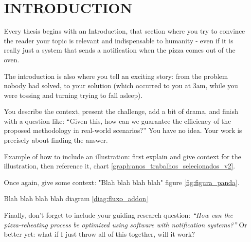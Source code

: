 \chapter{INTRODUCTION}
\label{chap:contextualizacao}

Every thesis begins with an Introduction, that section where you try to convince the reader your topic is relevant and indispensable to humanity - even if it is really just a system that sends a notification when the pizza comes out of the oven.

The introduction is also where you tell an exciting story: from the problem nobody had solved, to your solution (which occurred to you at 3am, while you were tossing and turning trying to fall asleep).

You describe the context, present the challenge, add a bit of drama, and finish with a question like: \enquote{Given this, how can we guarantee the efficiency of the proposed methodology in real-world scenarios?} You have no idea. Your work is precisely about finding the answer.

Example of how to include an illustration: first explain and give context for the illustration, then reference it, chart \ref{graph:anos_trabalhos_selecionados_v2}.



Once again, give some context: "Blah blah blah blah" figure \ref{fig:figura_panda}.




Blah blah blah blah diagram \ref{diag:fluxo_addon}



Finally, don't forget to include your guiding research question: \textit{\enquote{How can the pizza-reheating process be optimized using software with notification systems?}} Or better yet: what if I just throw all of this together, will it work?
